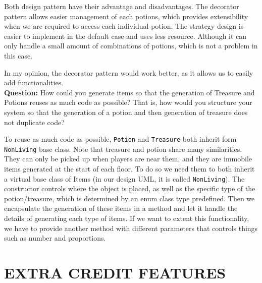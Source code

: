 \documentclass[11pt]{article}
\theoremstyle{plain} \newtheorem{theorem*}{Theorem}[subsection]
\begin{document}
Both design pattern have their advantage and disadvantages. The decorator
pattern allows easier management of each potions, which provides extensibility
when we are required to access each individual potion. The strategy design is
easier to implement in the default case and uses less resource. Although it can
only handle a small amount of combinations of potions, which is not a problem
in this case.  

In my opinion, the decorator pattern would work better, as it allows us to
easily add functionalities. \\

\textbf{Question:}
How could you generate items so that the generation of Treasure and Potions
reuses as much code as possible? That is, how would you structure your system
so that the generation of a potion and then generation of treasure does not
duplicate code? 

To reuse as much code as possible, \texttt{Potion} and \texttt{Treasure}
both inherit form \texttt{NonLiving} base class.
Note that treasure and potion share many similarities. They
can only be picked up when players are near them, and they are immobile items
generated at the start of each floor. To do so we need them to both inherit a
virtual base class of Items (in our design UML, it is called \texttt{NonLiving}). The
constructor controls where the object is placed, as well as the specific type
of the potion/treasure, which is determined by an enum class type predefined.
Then we encapsulate the generation of these items in a method and let it handle
the details of generating each type of items. If we want to extent this
functionality, we have to provide another method with different parameters that
controls things such as number and proportions. 









\section{EXTRA CREDIT FEATURES}
\end{document}

